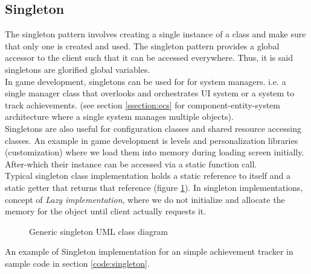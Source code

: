 \begin{multicols}{2}
\subsection{Singleton}

The singleton pattern involves creating a single instance of a class and make sure that only one is created and used\cite{tp-singleton}. The singleton pattern provides a global accessor to the client such that it can be accessed everywhere. Thus, it is said singletons are glorified global variables.\cite{ood-singleton, sm-singleton}\bs
\\
In game development, singletons can be used for for system managers. i.e. a single manager class that overlooks and orchestrates UI system or a system to track achievements. (see section \ref{ssection:ecs} for component-entity-system architecture where a single system manages multiple objects).\bs
\\
Singletons are also useful for configuration classes and shared resource accessing classes.\cite{ood-singleton} An example in game development is levels and personalization libraries (customization) where we load them into memory during loading screen initially. After-which their instance can be accessed via a static function call.\bs
\\
Typical singleton class implementation holds a static reference to itself and a static getter that returns that reference (figure \ref{fig:singleton}). In singleton implementations, concept of \textit{Lazy implementation}, where we do not initialize and allocate the memory for the object until client actually requests it.

\begin{figure}[H]
	\centering


	\caption{Generic singleton UML class diagram}
	\label{fig:singleton}
\end{figure}

An example of Singleton implementation for an simple achievement tracker in sample code in section \ref{code:singleton}.

\iftwocolumns
\end{multicols}
\fi